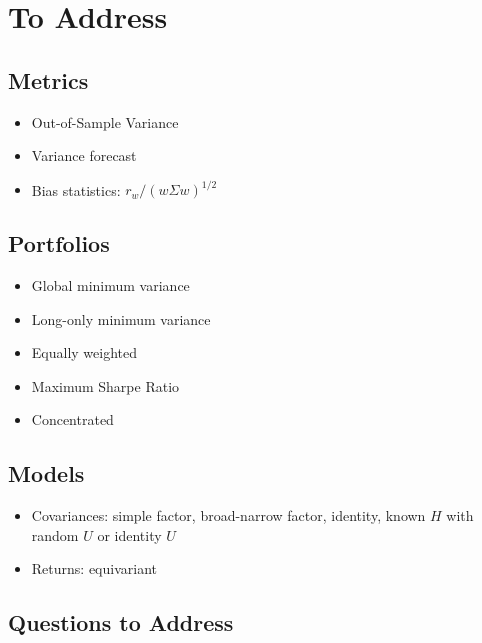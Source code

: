 \documentclass{article}
\begin{document}


\section{To Address}

\subsection{Metrics}

\begin{itemize}
	\item Out-of-Sample Variance
	\item Variance forecast
	\item Bias statistics: $r_w / (w\Sigma w)^{1/2}$
\end{itemize}

\subsection{Portfolios}

\begin{itemize}
	\item Global minimum variance
	\item Long-only minimum variance
	\item Equally weighted
	\item Maximum Sharpe Ratio
	\item Concentrated
\end{itemize}

\subsection{Models}

\begin{itemize}
	\item Covariances: simple factor, broad-narrow factor, identity, known $H$ with random $U$ or identity $U$
	\item Returns: equivariant
\end{itemize}


\subsection{Questions to Address}
\end{document}
